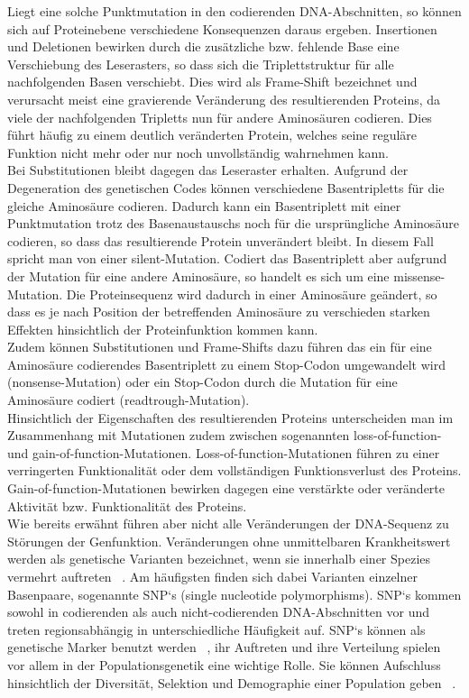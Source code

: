 Liegt eine solche Punktmutation in den codierenden DNA-Abschnitten, so können sich auf Proteinebene verschiedene Konsequenzen daraus ergeben. Insertionen und Deletionen bewirken durch die zusätzliche bzw. fehlende Base eine Verschiebung des Leserasters, so dass sich die Triplettstruktur für alle nachfolgenden Basen verschiebt. Dies wird als Frame-Shift bezeichnet und verursacht meist eine gravierende Veränderung des resultierenden Proteins, da viele der nachfolgenden Tripletts nun für andere Aminosäuren codieren. Dies führt häufig zu einem deutlich veränderten Protein, welches seine reguläre Funktion nicht mehr oder nur noch unvollständig wahrnehmen kann. \\

Bei Substitutionen bleibt dagegen das Leseraster erhalten. Aufgrund der Degeneration des genetischen Codes können verschiedene Basentripletts für die gleiche Aminosäure codieren. Dadurch kann ein Basentriplett mit einer Punktmutation trotz des Basenaustauschs noch für die ursprüngliche Aminosäure codieren, so dass das resultierende Protein unverändert bleibt. In diesem Fall spricht man von einer silent-Mutation. Codiert das Basentriplett aber aufgrund der Mutation für eine andere Aminosäure, so handelt es sich um eine missense-Mutation. Die Proteinsequenz wird dadurch in einer Aminosäure geändert, so dass es je nach Position der betreffenden Aminosäure zu verschieden starken Effekten hinsichtlich der Proteinfunktion kommen kann. \\

Zudem können Substitutionen und Frame-Shifts dazu führen das ein für eine Aminosäure codierendes Basentriplett zu einem Stop-Codon umgewandelt wird (nonsense-Mutation) oder ein Stop-Codon durch die Mutation für eine Aminosäure codiert (readtrough-Mutation). \\

Hinsichtlich der Eigenschaften des resultierenden Proteins unterscheiden man im Zusammenhang mit Mutationen zudem zwischen sogenannten loss-of-function- und gain-of-function-Mutationen. Loss-of-function-Mutationen führen zu einer verringerten Funktionalität oder dem vollständigen Funktionsverlust des Proteins. Gain-of-function-Mutationen bewirken dagegen eine verstärkte oder veränderte Aktivität bzw. Funktionalität des Proteins. \\

Wie bereits erwähnt führen aber nicht alle Veränderungen der DNA-Sequenz zu Störungen der Genfunktion. Veränderungen ohne unmittelbaren Krankheitswert werden als genetische Varianten bezeichnet, wenn sie innerhalb einer Spezies vermehrt auftreten ~\cite{vignal_2002, sachidanandam_2001}. Am häufigsten finden sich dabei Varianten einzelner Basenpaare, sogenannte SNP‘s (single nucleotide polymorphisms). SNP‘s kommen sowohl in codierenden als auch nicht-codierenden DNA-Abschnitten vor und treten regionsabhängig in unterschiedliche Häufigkeit auf. SNP‘s können als genetische Marker benutzt werden ~\cite{kruglyak_1997, kwok_2003}, ihr Auftreten und ihre Verteilung spielen vor allem in der Populationsgenetik eine wichtige Rolle. Sie können Aufschluss hinsichtlich der Diversität, Selektion und Demographie einer Population geben ~\cite{nielsen_2004, shriver_2004, akey_2002}. \\

